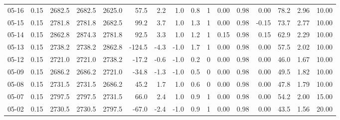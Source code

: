 \begin{threeparttable}
{\begin{tabular}{lrrrrrrrrrrrrrrr}
  05-16 &     0.15 & 2682.5 & 2682.5 & 2625.0 &       57.5 &            2.2 &                      1.0 &                 0.8 &              1 &       0.00 &      0.98 &           0.00 &             78.2 &            2.96 &                  10.00 \\
  05-15 &     0.15 & 2781.8 & 2781.8 & 2682.5 &       99.2 &            3.7 &                      1.0 &                 1.3 &              1 &       0.00 &      0.98 &          -0.15 &             73.7 &            2.77 &                  10.00 \\
  05-14 &     0.15 & 2862.8 & 2874.3 & 2781.8 &       92.5 &            3.3 &                      1.0 &                 1.2 &              1 &       0.15 &      0.98 &           0.15 &             62.9 &            2.29 &                  10.00 \\
  05-13 &     0.15 & 2738.2 & 2738.2 & 2862.8 &     -124.5 &           -4.3 &                     -1.0 &                 1.7 &              1 &       0.00 &      0.98 &           0.00 &             57.5 &            2.02 &                  10.00 \\
  05-12 &     0.15 & 2721.0 & 2721.0 & 2738.2 &      -17.2 &           -0.6 &                     -1.0 &                 0.2 &              0 &       0.00 &      0.98 &           0.00 &             46.0 &            1.67 &                  10.00 \\
  05-09 &     0.15 & 2686.2 & 2686.2 & 2721.0 &      -34.8 &           -1.3 &                     -1.0 &                 0.5 &              0 &       0.00 &      0.98 &           0.00 &             49.5 &            1.82 &                  10.00 \\
  05-08 &     0.15 & 2731.5 & 2731.5 & 2686.2 &       45.2 &            1.7 &                      1.0 &                 0.6 &              0 &       0.00 &      0.98 &           0.00 &             47.8 &            1.79 &                  10.00 \\
  05-07 &     0.15 & 2797.5 & 2797.5 & 2731.5 &       66.0 &            2.4 &                      1.0 &                 0.9 &              1 &       0.00 &      0.98 &           0.00 &             54.2 &            2.00 &                  15.00 \\
  05-02 &     0.15 & 2730.5 & 2730.5 & 2797.5 &      -67.0 &           -2.4 &                     -1.0 &                 0.9 &              1 &       0.00 &      0.98 &           0.00 &             43.5 &            1.56 &                  20.00 \\

\end{tabular}}
\end{threeparttable}

